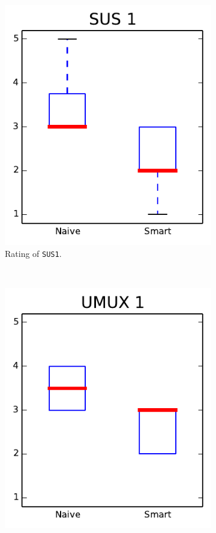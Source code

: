 \begin{figure}[h!]
\centering
\begin{subfigure}[t]{0.32\textwidth}
\centering
\includegraphics[width=\textwidth]{img/graphs/4a_00.pdf}
\caption{Rating of \texttt{SUS1}.}
\end{subfigure}%
~
\begin{subfigure}[t]{0.32\textwidth}
\centering
\includegraphics[width=\textwidth]{img/graphs/4a_01.pdf}

\end{subfigure}
\end{figure}
